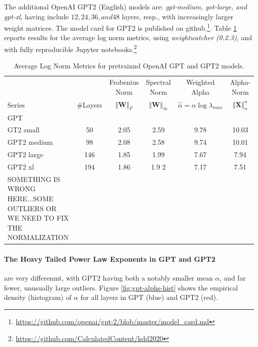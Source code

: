 The additional OpenAI GPT2 (English) models are: \emph{gpt-medium, got-large, and gpt-xl}, 
having include $12, 24, 36, and 48$ layers, resp., with increasingly larger weight matrices.
The model card for GPT2 is published on github.\footnote{\url{https://github.com/openai/gpt-2/blob/master/model_card.md}}.
Table \ref{table:nlp} reports results for the average log norm metrics, using \emph{weightwatcher (0.2.3)},
and with fully reproducible Jupyter notebooks.\footnote{\url{https://github.com/CalculatedContent/kdd2020}}


\begin{table}[t]
\small
\begin{center}
\begin{tabular}{|p{1in}|c|c|c|c|c|}
\hline
   &    & Frobenius Norm & Spectral Norm & Weighted Alpha & Alpha-Norm \\
 Series & \#Layers   & $\Vert\mathbf{W}\Vert_{F}$ & $\Vert\mathbf{W}\Vert_{\infty}$ & $\hat{\alpha}=\alpha\log\lambda_{max}$ & $\Vert\mathbf{X}\Vert^{\alpha}_{\alpha}$ \\
\hline
 GPT & & & & &\\
GT2 small & 50 & 2.05 & 2.59& 9.78 & 10.03 \\
GPT2 medium & 98 & 2.08 & 2.58& 9.74 & 10.01 \\
GPT2 large & 146 & 1.85 & 1.99& 7.67 & 7.94 \\
GPT2 xl & 194 & 1.86 &1.9 2& 7.17 & 7.51 \\

SOMETHING IS WRONG HERE...SOME OUTLIERS OR WE NEED TO FIX THE NORMALIZATION

\hline
\end{tabular}
\end{center}
\caption{Average Log Norm Metrics for pretrainnd OpenAI GPT and GPT2 models.}
\label{table:nlp}
\end{table}


\paragraph{The Heavy Tailed Power Law Exponents in GPT and GPT2}

are very differenmt, with GPT2 having both a notably smaller mean $\alpha$, and far fewer, unusually large outliers.
Figure \ref{fig:gpt-alphs-hist} shows the empirical density (histogram) of $\alpha$
for all layers in GPT (blue) and GPT2 (red).  


